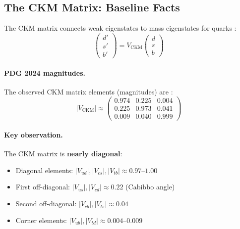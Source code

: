 \subsection{The CKM Matrix: Baseline Facts}
\label{sec:ch7_baseline}

The CKM matrix connects weak eigenstates to mass eigenstates for quarks \tagBL{}:
\begin{equation}
    \begin{pmatrix} d' \\ s' \\ b' \end{pmatrix}
    = V_{\text{CKM}}
    \begin{pmatrix} d \\ s \\ b \end{pmatrix}
    \label{eq:ch7_ckm_def}
\end{equation}

\paragraph{PDG 2024 magnitudes.}
The observed CKM matrix elements (magnitudes) are \tagBL{}:
\begin{equation}
    |V_{\text{CKM}}| \approx
    \begin{pmatrix}
        0.974 & 0.225 & 0.004 \\
        0.225 & 0.973 & 0.041 \\
        0.009 & 0.040 & 0.999
    \end{pmatrix}
    \label{eq:ch7_ckm_pdg}
\end{equation}

\paragraph{Key observation.}
The CKM matrix is \textbf{nearly diagonal}:
\begin{itemize}[nosep]
    \item Diagonal elements: $|V_{ud}|, |V_{cs}|, |V_{tb}| \approx 0.97$--$1.00$
    \item First off-diagonal: $|V_{us}|, |V_{cd}| \approx 0.22$ (Cabibbo angle)
    \item Second off-diagonal: $|V_{cb}|, |V_{ts}| \approx 0.04$
    \item Corner elements: $|V_{ub}|, |V_{td}| \approx 0.004$--$0.009$
\end{itemize}

